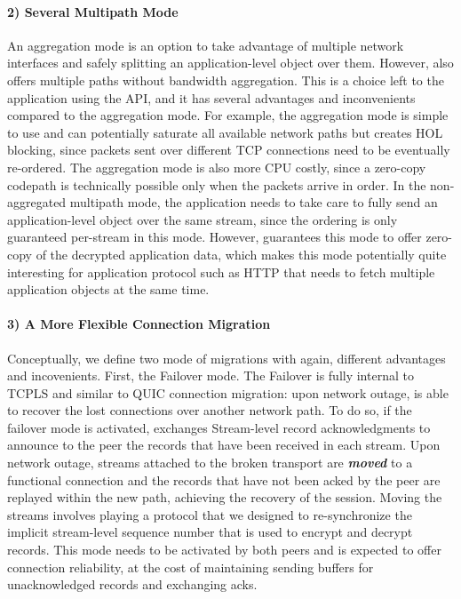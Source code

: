 \paragraph*{2) Several Multipath Mode}
An aggregation mode is an option to take advantage of multiple network
interfaces and safely splitting an application-level object over them. However,
\tcpls also offers multiple paths without bandwidth aggregation.
This is a choice left to the application using the API, and it has several
advantages and inconvenients compared to the aggregation mode. For example, the
aggregation mode is simple to use and can potentially saturate all available
network paths but creates HOL blocking, since packets sent over different TCP
connections need to be eventually re-ordered. The aggregation mode is also more CPU
costly, since a zero-copy codepath is technically possible only when the packets
arrive in order. In the non-aggregated multipath mode, the application needs to
take care to fully send an application-level object over the same stream, since
the ordering is only guaranteed per-stream in this mode. However, \tcpls
guarantees this mode to offer zero-copy of the decrypted application data, which
makes this mode potentially quite interesting for application protocol such as
HTTP that needs to fetch multiple application objects at the same time.

\paragraph*{3) A More Flexible Connection Migration}
Conceptually, we define two mode of migrations with again, different advantages
and incovenients. First, the Failover mode. The Failover is fully internal to
TCPLS and similar to QUIC connection migration: upon network outage, \tcpls is
able to recover the lost \tcp connections over another network path. To do so, if
the failover mode is activated, \tcpls exchanges Stream-level record
acknowledgments to announce to the peer the records that have been received in
each stream. Upon network outage, streams attached to the broken transport are
\textbf{\textit{moved}} to a functional \tcp connection and  the records that have not been acked
by the peer are replayed within the new path, achieving the recovery of the session.
Moving the streams involves playing a protocol that we designed to
re-synchronize the implicit stream-level sequence number that is used to
encrypt and decrypt records. This mode needs to be activated by both peers and
is expected to offer connection reliability, at the cost of maintaining sending
buffers for unacknowledged records and exchanging acks.

